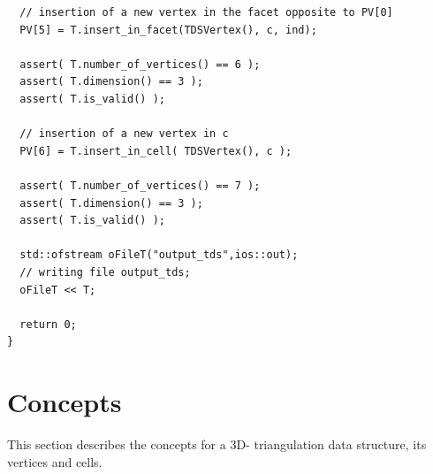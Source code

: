 \begin{verbatim}
  // insertion of a new vertex in the facet opposite to PV[0]
  PV[5] = T.insert_in_facet(TDSVertex(), c, ind);
  
  assert( T.number_of_vertices() == 6 );
  assert( T.dimension() == 3 );
  assert( T.is_valid() );

  // insertion of a new vertex in c
  PV[6] = T.insert_in_cell( TDSVertex(), c );

  assert( T.number_of_vertices() == 7 );
  assert( T.dimension() == 3 );
  assert( T.is_valid() );

  std::ofstream oFileT("output_tds",ios::out);
  // writing file output_tds; 
  oFileT << T; 

  return 0;
}
\end{verbatim}

\clearpage

\section{Concepts}

This section describes the concepts for a 3D- triangulation data
structure, its vertices and cells.

